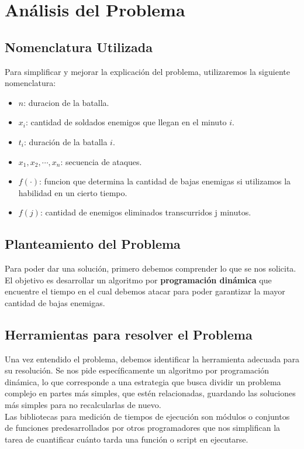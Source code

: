 \section{Análisis del Problema}
\subsection{Nomenclatura Utilizada}
Para simplificar y mejorar la explicación del problema, utilizaremos la siguiente nomenclatura:
\begin{itemize}
\item $n$: duracion de la batalla.
\item $x_i$: cantidad de soldados enemigos que llegan en el minuto $i$.
\item $t_i$: duración de la batalla $i$.
\item  $x_1, x_2, \cdots, x_n$: secuencia de ataques.
\item $f(\cdot)$: funcion que determina la cantidad de bajas enemigas si utilizamos la habilidad en un cierto tiempo.
\item $f(j)$: cantidad de enemigos eliminados transcurridos j minutos.
\end{itemize}

\subsection{Planteamiento del Problema}
Para poder dar una solución, primero debemos comprender lo que se nos solicita. El objetivo es desarrollar un algoritmo por \textbf{programación dinámica} que encuentre el tiempo en el cual debemos atacar para poder garantizar la mayor cantidad de bajas enemigas.
\subsection{Herramientas para resolver el Problema}
Una vez entendido el problema, debemos identificar la herramienta adecuada para su resolución. Se nos pide específicamente un algoritmo por programación dinámica, lo que corresponde a una estrategia que busca dividir un problema complejo en partes más simples, que estén relacionadas, guardando las soluciones más simples para no recalcularlas de nuevo.\\ 
Las bibliotecas para medición de tiempos de ejecución son módulos o conjuntos de funciones predesarrollados por otros programadores que nos simplifican la tarea de cuantificar cuánto tarda una función o script en ejecutarse.